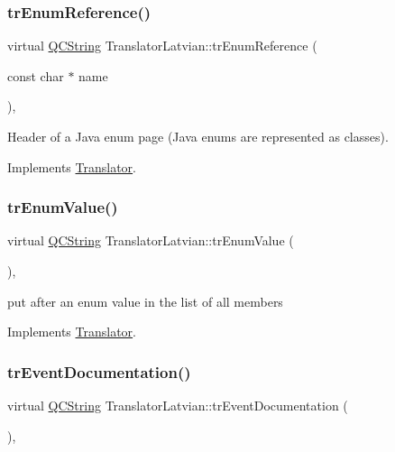 \subsubsection{\texorpdfstring{trEnumReference()}{trEnumReference()}}
{\footnotesize\ttfamily virtual \mbox{\hyperlink{class_q_c_string}{Q\+C\+String}} Translator\+Latvian\+::tr\+Enum\+Reference (\begin{DoxyParamCaption}\item[{const char $\ast$}]{name }\end{DoxyParamCaption})\hspace{0.3cm}{\ttfamily [inline]}, {\ttfamily [virtual]}}

Header of a Java enum page (Java enums are represented as classes). 

Implements \mbox{\hyperlink{class_translator}{Translator}}.

\mbox{\label{class_translator_latvian_af530ff043fadc1c037700658791fb1f6}} 
\subsubsection{\texorpdfstring{trEnumValue()}{trEnumValue()}}
{\footnotesize\ttfamily virtual \mbox{\hyperlink{class_q_c_string}{Q\+C\+String}} Translator\+Latvian\+::tr\+Enum\+Value (\begin{DoxyParamCaption}{ }\end{DoxyParamCaption})\hspace{0.3cm}{\ttfamily [inline]}, {\ttfamily [virtual]}}

put after an enum value in the list of all members 

Implements \mbox{\hyperlink{class_translator}{Translator}}.

\mbox{\label{class_translator_latvian_a894ab88d36cb6e57963acbd2e1a0603a}} 
\subsubsection{\texorpdfstring{trEventDocumentation()}{trEventDocumentation()}}
{\footnotesize\ttfamily virtual \mbox{\hyperlink{class_q_c_string}{Q\+C\+String}} Translator\+Latvian\+::tr\+Event\+Documentation (\begin{DoxyParamCaption}{ }\end{DoxyParamCaption})\hspace{0.3cm}{\ttfamily [inline]}, {\ttfamily [virtual]}}

